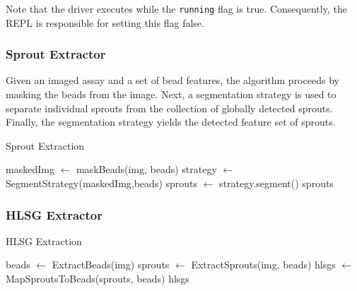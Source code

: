 \documentclass{sig-alternate}
\begin{document}
		Note that the driver executes while the \lstinline$running$ flag is
		true. Consequently, the REPL is responsible for setting this flag
		false.

	\subsubsection{Sprout Extractor} %
	\label{ssub:Sprout Extractor}
		Given an imaged assay and a set of bead features, the algorithm
		proceeds by masking the beads from the image. Next, a segmentation
		strategy is used to separate individual sprouts from the collection
		of globally detected sprouts. Finally, the segmentation strategy
		yields the detected feature set of sprouts.
		\begin{algorithm}[ht!] \caption{Sprout Extraction}
			\begin{algorithmic}
					\State maskedImg $\gets$ maskBeads(img, beads)
					\State strategy $\gets$ SegmentStrategy(maskedImg,beads)
					\State sprouts $\gets$ strategy.segment()
					\State \Return sprouts
				\EndProcedure
			\end{algorithmic}
		\end{algorithm}

	\subsubsection{HLSG Extractor} %
	\label{ssub:HLSG Extractor}
		\begin{algorithm}[ht!]
			\caption{HLSG Extraction}
			\begin{algorithmic}
				\Procedure{ExtractHLSGs}{img}
					\State beads $\gets$ ExtractBeads(img)
					\State sprouts $\gets$ ExtractSprouts(img, beads)
					\State hlsgs $\gets$ MapSproutsToBeads(sprouts, beads)
					\State \Return hlsgs
				\EndProcedure
			\end{algorithmic}
		\end{algorithm}
\end{document}
